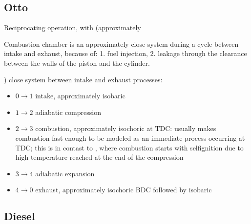 \documentclass[letterpaper,10pt,english]{jupyterBook}
\begin{document}
\subsection{Otto}
\label{\detokenize{ch/heat-engines:otto}}\label{\detokenize{ch/heat-engines:classical-thermodynamics-heat-engines-real-otto}}
\sphinxAtStartPar
{}

\sphinxAtStartPar
{}

\sphinxAtStartPar
{} Reciprocating operation, with (approximately%
\begin{footnote}[1]\sphinxAtStartFootnote
Combustion chamber is an approximately close system during a cycle between intake and exhaust, because of: 1. fuel injection, 2. leakage through the clearance between the walls of the piston and the cylinder.
%
\end{footnote}) close system between intake and exhaust processes:
\begin{itemize}
\item {} 
\sphinxAtStartPar
\(0 \rightarrow 1\) intake, approximately isobaric

\item {} 
\sphinxAtStartPar
\(1 \rightarrow 2\) adiabatic compression

\item {} 
\sphinxAtStartPar
\(2 \rightarrow 3\) combustion, approximately isochoric at TDC:  usually makes combustion fast enough to be modeled as an immediate process occurring at TDC; this is in contast to {\hyperref[\detokenize{ch/heat-engines:classical-thermodynamics-heat-engines-real-diesel}]{}}, where combustion starts with self\sphinxhyphen{}ignition due to high temperature reached at the end of the compression

\item {} 
\sphinxAtStartPar
\(3 \rightarrow 4\) adiabatic expansion

\item {} 
\sphinxAtStartPar
\(4 \rightarrow 0\) exhaust, approximately isochoric BDC followed by isobaric

\end{itemize}


\subsection{Diesel}
\label{\detokenize{ch/heat-engines:diesel}}\label{\detokenize{ch/heat-engines:classical-thermodynamics-heat-engines-real-diesel}}
\sphinxAtStartPar
{}
\end{document}
